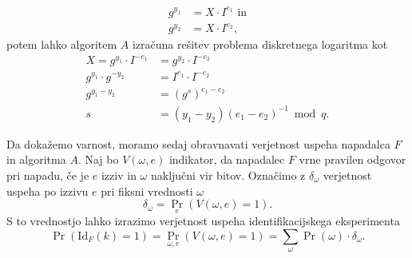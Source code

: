 \begin{dokaz}
\begin{enumerate}
            \begin{align*}
                g^{y_1} &= X \cdot I^{e_1} \text{ in} \\
                g^{y_2} &= X \cdot I^{e_2},
            \end{align*}
            potem lahko algoritem $A$ izračuna rešitev problema diskretnega logaritma kot
            \begin{align*}
                X = g^{y_1} \cdot I^{-e_1} &= g^{y_2} \cdot I^{-e_2} \\
                g^{y_1} \cdot g^{-y_2} &= I^{e_1} \cdot I^{-e_2} \\
                g^{y_1 - y_2} &= (g^s)^{e_1 - e_2} \\
                s &= (y_1 - y_2)(e_1 - e_2)^{-1} \bmod q.
            \end{align*}
    \end{enumerate}

    Da dokažemo varnost, moramo sedaj obravnavati verjetnost uspeha napadalca $F$ in algoritma $A$.
    Naj bo $V(\omega, e)$ indikator, da napadalec $F$ vrne pravilen odgovor pri napadu, če je $e$ izziv
    in $\omega$ naključni vir bitov. Označimo z $\delta_{\omega}$ verjetnost uspeha po izzivu $e$
    pri fiksni vrednosti $\omega$
    $$
    \delta_{\omega} = \Pr_e(V(\omega, e) = 1).
    $$
    S to vrednostjo lahko izrazimo verjetnost uspeha identifikacijskega eksperimenta
    $$
    \Pr(\text{Id}_F(k) = 1) = \Pr_{\omega, e}(V(\omega, e) = 1) =
        \sum_{\omega} \Pr(\omega) \cdot \delta_{\omega}.
    $$


\end{dokaz}
